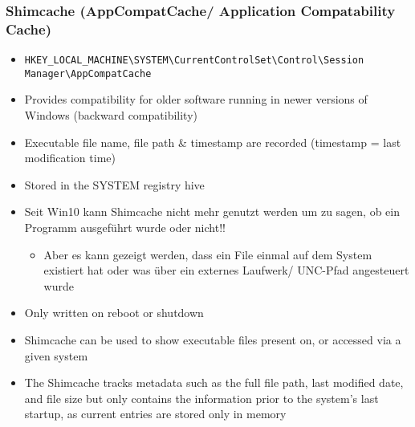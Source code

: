 \subsubsection{Shimcache (AppCompatCache/ Application Compatability Cache)}
\begin{itemize}
    \item \lstinline|HKEY_LOCAL_MACHINE\SYSTEM\CurrentControlSet\Control\Session Manager\AppCompatCache|
    \item Provides compatibility for older software running in newer versions of Windows (backward compatibility)
    \item Executable file name, file path \& timestamp are recorded (timestamp = last modification time)
    \item Stored in the SYSTEM registry hive
    \item Seit Win10 kann Shimcache nicht mehr genutzt werden um zu sagen, ob ein Programm ausgeführt wurde oder nicht!!
    \begin{itemize}
        \item Aber es kann gezeigt werden, dass ein File einmal auf dem System existiert hat oder was über ein externes Laufwerk/ UNC-Pfad angesteuert wurde
    \end{itemize}
    \item Only written on reboot or shutdown
    \item Shimcache can be used to show executable files present on, or accessed via a given system
    \item The Shimcache tracks metadata such as the full file path, last modified date, and file size but only contains the information prior to the system’s last startup, as current entries are stored only in memory
\end{itemize}